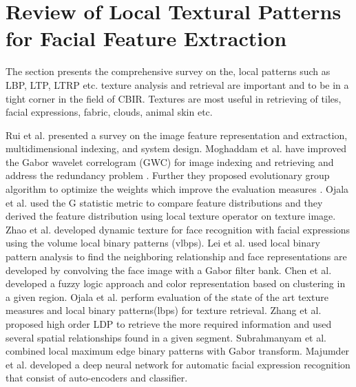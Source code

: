 \documentclass[review]{elsarticle}
\begin{document}
\section{Review of Local Textural Patterns for Facial Feature Extraction}
The section presents the comprehensive survey on the, local patterns such as LBP, LTP, LTRP etc. texture analysis and retrieval are important and to be in a tight corner in the field of CBIR. Textures are most useful in retrieving of tiles, facial expressions, fabric, clouds, animal skin etc. 

Rui et al. \cite{rui1999image} presented a survey on the image feature representation and extraction, multidimensional indexing, and system design. 
Moghaddam et al. \cite{moghaddam2006gabor} have improved the Gabor wavelet correlogram (GWC) for image indexing and retrieving and address the redundancy problem \cite{moghaddam2006gabor}. Further they proposed evolutionary group algorithm to optimize the weights which improve the  evaluation measures  \cite{Moghaddam2007novel}.  Ojala et al. \cite{pietikainen2000rotation} used the G statistic metric to compare feature distributions and they derived the feature distribution using local texture operator on texture image. 
 Zhao et al. \cite{zhao2007dynamic} developed dynamic texture for face recognition with facial expressions using the volume local binary patterns (vlbps).  Lei et al. \cite{lei2010face} used local binary pattern analysis to find the neighboring relationship and face representations are developed by convolving the face image with a Gabor filter bank. Chen et al. \cite{chen2002region,chen2005clue} developed a fuzzy logic approach and color representation based on clustering in a given region. Ojala et al. \cite{ojala1996comparative} perform evaluation of the state of the art  texture measures and local binary patterns(lbps) for texture retrieval. Zhang  et al. \cite{zhang2009local} proposed high order LDP to retrieve the more required information and used several spatial relationships found in a given segment. Subrahmanyam et al. \cite{subrahmanyam2012local} combined  local maximum edge binary patterns with Gabor transform. 
  Majumder et al. \cite{majumder2016automatic} developed a deep neural network for automatic facial expression recognition that consist of auto-encoders and classifier. 
\end{document}
